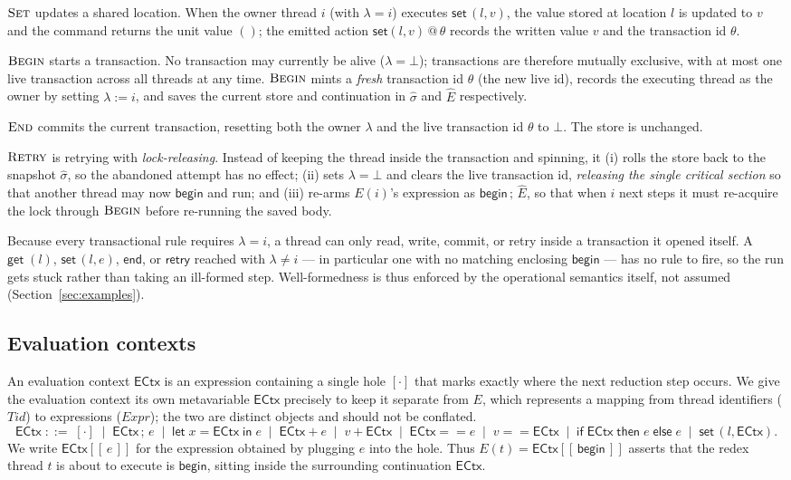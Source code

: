 \documentclass[manuscript,nonacm]{acmart}
\makeatletter
\theoremstyle{acmdefinition}
\newcommand{\unit}{()}
\newcommand{\bbegin}{\textsf{begin}}
\newcommand{\eend}{\textsf{end}}
\newcommand{\retry}{\textsf{retry}}
\newcommand{\getc}[1]{\textsf{get}\;(#1)}
\newcommand{\setc}[2]{\textsf{set}\,(#1,#2)}
\newcommand{\ectx}{\mathsf{ECtx}}
\newcommand{\ehole}[1]{\ectx[[\, #1 \,]]}
\newcommand{\setev}[3]{\textsf{set}(#1,#2)\,@\,#3}
\makeatother
\begin{document}
$\textrm{\sc{Set}}$ updates a shared location. When the owner thread $i$ (with $\lambda = i$) executes
$\setc{l}{v}$, the value stored at location $l$ is updated to $v$ and the
command returns the unit value $\unit$; the emitted action $\setev{l}{v}{\theta}$ records the written value $v$ and the transaction id $\theta$.

$\textrm{\sc{Begin}}$ starts a transaction. No transaction may currently be alive ($\lambda = \bot$); transactions are therefore mutually exclusive, with at most one live transaction across all threads at any time. $\textrm{\sc{Begin}}$ mints a \emph{fresh} transaction id $\theta$ (the new live id), records the executing thread as the owner by setting $\lambda := i$, and saves the current store and continuation in $\hat{\sigma}$ and $\hat{E}$ respectively.

$\textsc{End}$ commits the current transaction, resetting both the owner $\lambda$ and the live transaction id $\theta$ to $\bot$. The store is unchanged.


$\textsc{Retry}$ is retrying with \emph{lock-releasing}. Instead of keeping the thread inside the transaction and spinning, it (i) rolls the store back to the snapshot $\hat{\sigma}$, so the abandoned attempt has no effect; (ii) sets $\lambda=\bot$ and clears the live transaction id, \emph{releasing the single critical section} so that another thread may now $\bbegin$ and run; and (iii) re-arms $E(i)$'s expression as $\bbegin\,;\,\hat{E}$, so that when $i$ next steps it must re-acquire the lock through $\textsc{Begin}$ before re-running the saved body.

Because every transactional rule requires $\lambda = i$, a thread can only read, write, commit, or retry inside a transaction it opened itself. A $\getc{l}$, $\setc{l}{e}$, $\eend$, or $\retry$ reached with $\lambda \neq i$ --- in particular one with no matching enclosing $\bbegin$ --- has no rule to fire, so the run gets stuck rather than taking an ill-formed step. Well-formedness is thus enforced by the operational semantics itself, not assumed (Section~\ref{sec:examples}).

\subsection{Evaluation contexts}

An evaluation context $\ectx$ is an expression containing a single
hole $[\cdot]$ that marks exactly where the next reduction step occurs. We give
the evaluation context its own metavariable $\ectx$ precisely to keep it
separate from $E$, which represents a mapping from thread identifiers
($\mathit{Tid}$) to expressions ($\mathit{Expr}$); the two are distinct objects
and should not be conflated.
\[
\ectx \;::=\; [\cdot]
\;\mid\; \ectx\,;\,e
\;\mid\; \textsf{let}\;x = \ectx\;\textsf{in}\;e
\;\mid\; \ectx + e \;\mid\; v + \ectx
\;\mid\; \ectx == e \;\mid\; v == \ectx
\;\mid\; \textsf{if}\;\ectx\;\textsf{then}\;e\;\textsf{else}\;e
\;\mid\; \setc{l}{\ectx}.
\]
We write $\ehole{e}$ for the expression obtained by plugging $e$ into the hole. Thus
$E(t)=\ehole{\bbegin}$ asserts that the redex thread $t$ is about to execute is
$\bbegin$, sitting inside the surrounding continuation $\ectx$.
\end{document}
